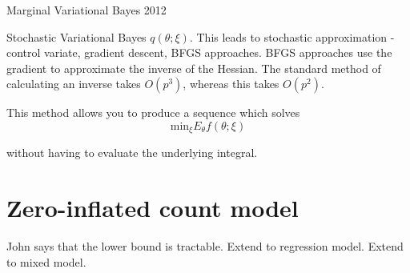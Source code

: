 \documentclass{amsart}
\begin{document}
Marginal Variational Bayes 2012

Stochastic Variational Bayes $q(\theta; \xi)$. This leads to stochastic approximation - control variate,
gradient descent, BFGS approaches. BFGS approaches use the gradient to approximate the inverse of the
Hessian. The standard method of calculating an inverse takes $O(p^3)$, whereas this takes $O(p^2)$.

This method allows you to produce a sequence which solves
$$
\text{min}_{\xi} E_{\theta} f(\theta; \xi)
$$

without having to evaluate the underlying integral.

\section{Zero-inflated count model}
John says that the lower bound is tractable.
Extend to regression model.
Extend to mixed model.
\end{document}

